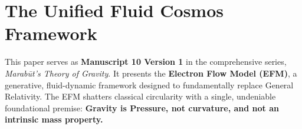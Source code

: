 \documentclass[11pt, a4paper]{article}
\begin{document}
\clearpage
\section*{The Unified Fluid Cosmos Framework}
  This paper serves as \textbf{Manuscript 10 Version 1} in the comprehensive series, \textit{Marab\={u}t's Theory of Gravity}. It presents the \textbf{Electron Flow Model (EFM)}, a generative, fluid-dynamic framework designed to fundamentally replace General Relativity. The EFM shatters classical circularity with a single, undeniable foundational premise: \textbf{Gravity is Pressure, not curvature, and not an intrinsic mass property.}
\end{document}
